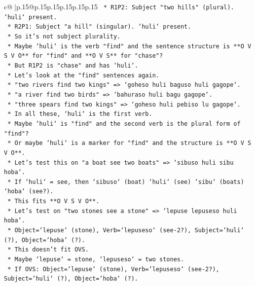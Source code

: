 \documentclass{article}
\begin{document}
{\begin{supertabular}{c@{$\;$}|p{.15\linewidth}@{}p{.15\linewidth}p{.15\linewidth}p{.15\linewidth}p{.15\linewidth}p{.15\linewidth}}
{{{\texttt{                *   R1P2: Subject "two hills" (plural). `huli` present.} \\
\texttt{                *   R2P1: Subject "a hill" (singular). `huli` present.} \\
\texttt{                *   So it's not subject plurality.} \\
\texttt{                *   Maybe `huli` is the verb "find" and the sentence structure is **O V S V O** for "find" and **O V S** for "chase"?} \\
\texttt{                *   But R1P2 is "chase" and has `huli`.} \\
\texttt{                *   Let's look at the "find" sentences again.} \\
\texttt{                *   "two rivers find two kings" => `goheso huli baguso huli gagope`.} \\
\texttt{                *   "a river find two birds" => `bahuraso huli bagu gagope`.} \\
\texttt{                *   "three spears find two kings" => `goheso huli pebiso lu gagope`.} \\
\texttt{                *   In all these, `huli` is the first verb.} \\
\texttt{                *   Maybe `huli` is "find" and the second verb is the plural form of "find"?} \\
\texttt{                *   Or maybe `huli` is a marker for "find" and the structure is **O V S V O**.} \\
\texttt{                *   Let's test this on "a boat see two boats" => `sibuso huli sibu hoba`.} \\
\texttt{                    *   If `huli` = see, then `sibuso` (boat) `huli` (see) `sibu` (boats) `hoba` (see?).} \\
\texttt{                    *   This fits **O V S V O**.} \\
\texttt{                *   Let's test on "two stones see a stone" => `lepuse lepuseso huli hoba`.} \\
\texttt{                    *   Object=`lepuse` (stone), Verb=`lepuseso` (see{-}2?), Subject=`huli` (?), Object=`hoba` (?).} \\
\texttt{                    *   This doesn't fit OVS.} \\
\texttt{                    *   Maybe `lepuse` = stone, `lepuseso` = two stones.} \\
\texttt{                    *   If OVS: Object=`lepuse` (stone), Verb=`lepuseso` (see{-}2?), Subject=`huli` (?), Object=`hoba` (?).} \\
}}}
\end{supertabular}}
\end{document}
